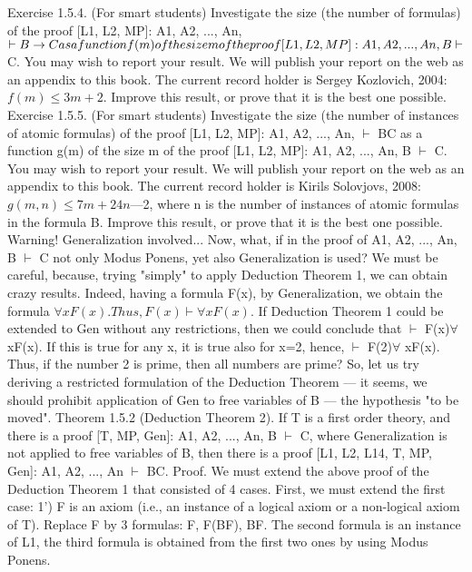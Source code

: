 Exercise 1.5.4. (For smart students) Investigate the size (the number of formulas) of the proof [L1, L2,
MP]: A1, A2, ..., An, \(\vdash B\rightarrow C as a function f(m) of the size m of the proof [L1, L2, MP]: A1, A2, ..., An, B \vdash\)
C. You may wish to report your result. We will publish your report on the web as an appendix to this
book. The current record holder is Sergey Kozlovich, 2004: \(f(m) \leq 3m+2\). Improve this result, or prove
that it is the best one possible.
Exercise 1.5.5. (For smart students) Investigate the size (the number of instances of atomic formulas) of
the proof [L1, L2, MP]: A1, A2, ..., An, \(\vdash\) B\IMPLIES C as a function g(m) of the size m of the proof [L1, L2, MP]:
A1, A2, ..., An, B \(\vdash\) C. You may wish to report your result. We will publish your report on the web as an
appendix to this book. The current record holder is Kirils Solovjovs, 2008: \(g(m, n) \leq 7m+24n\)---2, where n
is the number of instances of atomic formulas in the formula B. Improve this result, or prove that it is the
best one possible.
Warning! Generalization involved...
Now, what, if in the proof of A1, A2, ..., An, B \(\vdash\) C not only Modus Ponens, yet also Generalization is
used?
We must be careful, because, trying "simply" to apply Deduction Theorem 1, we can obtain crazy results.
Indeed, having a formula F(x), by Generalization, we obtain the formula \(\forall xF(x). Thus, F(x) \vdash \forall xF(x)\). If
Deduction Theorem 1 could be extended to Gen without any restrictions, then we could conclude that \(\vdash\)
F(x)\IMPLIES \(\forall\) xF(x). If this is true for any x, it is true also for x=2, hence, \(\vdash\) F(2)\IMPLIES \(\forall\) xF(x). Thus, if the number
2 is prime, then all numbers are prime?
So, let us try deriving a restricted formulation of the Deduction Theorem --- it seems, we should prohibit
application of Gen to free variables of B --- the hypothesis "to be moved".
Theorem 1.5.2 (Deduction Theorem 2). If T is a first order theory, and there is a proof [T, MP, Gen]: A1,
A2, ..., An, B \(\vdash\) C, where Generalization is not applied to free variables of B, then there is a proof [L1, L2,
L14, T, MP, Gen]: A1, A2, ..., An \(\vdash\) B\IMPLIES C.
Proof. We must extend the above proof of the Deduction Theorem 1 that consisted of 4 cases. First, we
must extend the first case:
1') F is an axiom (i.e., an instance of a logical axiom or a non-logical axiom of T). Replace F by 3
formulas: F, F\IMPLIES (B\IMPLIES F), B\IMPLIES F. The second formula is an instance of L1, the third formula is obtained
from the first two ones by using Modus Ponens.
